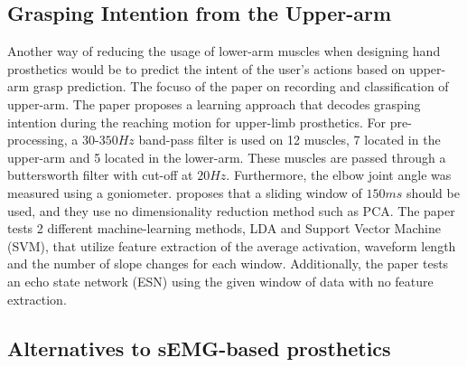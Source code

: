 \documentclass[../main.tex]{subfiles}
\begin{document}
\subsection{Grasping Intention from the Upper-arm}

Another way of reducing the usage of lower-arm muscles when designing hand prosthetics would be to predict the intent of the user's actions based on upper-arm grasp prediction.
The focuso of the paper \cite{Batzianoulis2018} on recording and classification of upper-arm.
The paper proposes a learning approach that decodes grasping intention during the reaching motion for upper-limb prosthetics.
For pre-processing, a $30$-$350Hz$ band-pass filter is used on 12 muscles, 7 located in the upper-arm and 5 located in the lower-arm.
These muscles are passed through a buttersworth filter with cut-off at $20Hz$.
Furthermore, the elbow joint angle was measured using a goniometer.
\cite{Batzianoulis2018} proposes that a sliding window of $150ms$ should be used, and they use no dimensionality reduction method such as PCA.
The paper tests 2 different machine-learning methods, LDA and Support Vector Machine (SVM), that utilize feature extraction of the average activation, waveform length and the number of slope changes for each window.
Additionally, the paper tests an echo state network (ESN) using the given window of data with no feature extraction.

\subsection{Alternatives to sEMG-based prosthetics}
\end{document}

